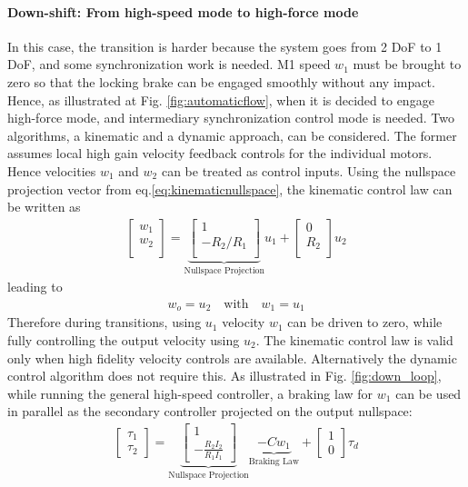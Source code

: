 \paragraph{Down-shift: From high-speed mode to high-force mode}
In this case, the transition is harder because the system goes from 2 DoF to 1 DoF, and some synchronization work is needed. M1 speed $w_1$ must be brought to zero so that the locking brake can be engaged smoothly without any impact. Hence, as illustrated at Fig. \ref{fig:automaticflow}, when it is decided to engage high-force mode, and intermediary synchronization control mode is needed. Two algorithms, a kinematic and a dynamic approach, can be considered. The former assumes local high gain velocity feedback controls for the individual motors. Hence velocities $w_1$ and $w_2$ can be treated as control inputs. Using the nullspace projection vector from eq.\eqref{eq:kinematicnullspace}, the kinematic control law can be written as 
%
\begin{align}
\left[
\begin{array}{c}
w_1 \\
w_2 \\
\end{array}
\right]=
\underbrace{\left[
\begin{array}{c}
1 \\
-R_2/R_1 \\
\end{array}
\right]}_{\text{Nullspace Projection}}
u_1 + 
\left[
\begin{array}{c}
0 \\
R_2 \\
\end{array}
\right] u_2
\label{eq:kinematicsys}
\end{align}
%
leading to
%
\begin{align}
w_o = u_2 \quad \text{with} \quad w_1 = u_1
\end{align}
%
Therefore during transitions, using $u_1$ velocity $w_1$ can be driven to zero, while fully controlling the output velocity using $u_2$. The kinematic control law is valid only when high fidelity velocity controls are available. Alternatively the dynamic control algorithm does not require this. As illustrated in Fig. \ref{fig:down_loop}, while running the general high-speed controller, a braking law for $w_1$ can be used in parallel as the secondary controller projected on the output nullspace:
\begin{align}
\left[ \begin{array}{c}
\tau_1 \\
\tau_2
\end{array} \right]
 = 
\underbrace{\left[ \begin{array}{c}
1 \\
-\frac{R_2 I_2}{R_1 I_1} 
\end{array} \right]}_{\text{Nullspace Projection}} \underbrace{-C w_1}_{\text{Braking Law}} + 
\left[ \begin{array}{c}
1 \\
0 
\end{array} \right]  \tau_d
\label{eq:syncrhonization_ctl}
\end{align}
